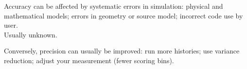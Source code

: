 \documentclass[12pt, answers]{exam}
\begin{document}
Accuracy can be affected by systematic errors in simulation: physical and mathematical models; errors in geometry or source model; incorrect code use by user.\\
Usually unknown.

Conversely, precision can usually be improved: run more histories; use variance reduction; adjust your measurement (fewer scoring bins).

\vspace*{1 em}
\end{document}

